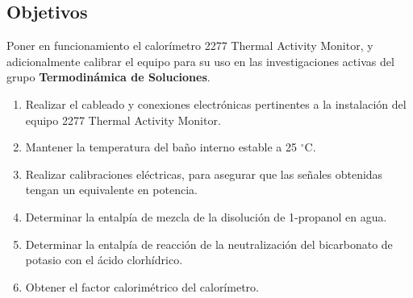 \documentclass[a0]{sciposter}
\newcommand{\groupname}{\textbf{Termodinámica de Soluciones}}
\newcommand{\grad}{$^\circ$C}
\begin{document}
\begin{multicols}{3}
\section{Objetivos}
	Poner en funcionamiento el calorímetro 2277 Thermal Activity Monitor, y adicionalmente calibrar el equipo para su uso en las investigaciones activas del grupo \groupname.
	\begin{enumerate}
		\item Realizar el cableado y conexiones electrónicas pertinentes a la instalaci\'on del equipo 2277 Thermal Activity Monitor.
		\item Mantener la temperatura del ba\~no interno estable a 25 \grad{}.
		\item Realizar calibraciones eléctricas, para asegurar que las señales obtenidas tengan un equivalente en potencia.
		\item Determinar la entalpía de mezcla de la disolución de 1-propanol en agua.
		\item Determinar la entalpía de reacción de la neutralización del bicarbonato de potasio con el \'acido clorhídrico.
		\item Obtener el factor calorimétrico del calorímetro.
	\end{enumerate}


\end{multicols}
\end{document}
